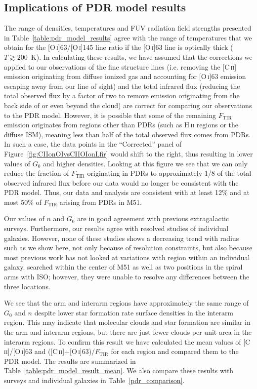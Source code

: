 \documentclass[preprint2]{aastex}
\begin{document}
\subsection{Implications of PDR model results}
The range of densities, temperatures and FUV radiation field strengths presented in Table~\ref{table:pdr_model_results} agree with the range of temperatures that we obtain for the [O\,\textsc{i}]63/[O\,\textsc{i}]145 line ratio if the [O\,\textsc{i}]63 line is optically thick ($T \gtrsim 200$~K).  In calculating these results, we have assumed that the corrections we applied to our observations of the fine structure lines (i.e. removing the [C\,\textsc{ii}] emission originating from diffuse ionized gas and accounting for [O\,\textsc{i}]63 emission escaping away from our line of sight) and the total infrared flux (reducing the total observed flux by a factor of two to remove emission originating from the back side of or even beyond the cloud) are correct for comparing our observations to the PDR model.  However, it is possible that some of the remaining $F_{\mathrm{TIR}}$ emission originates from regions other than PDRs (such as H\,\textsc{ii} regions or the diffuse ISM), meaning less than half of the total observed flux comes from PDRs.  In such a case, the data points in the ``Corrected'' panel of Figure~\ref{fig:CIIonOIvsCIIOIonLfir} would shift to the right, thus resulting in lower values of $G_{0}$ and higher densities.  Looking at this figure we see that we can only reduce the fraction of $F_{\mathrm{TIR}}$ originating in PDRs to approximately 1/8 of the total observed infrared flux before our data would no longer be consistent with the PDR model.  Thus, our data and analysis are consistent with at least 12\% and at most 50\% of $F_{\mathrm{TIR}}$ arising from PDRs in M51.

Our values of $n$ and $G_{0}$ are in good agreement with previous extragalactic surveys. Furthermore, our results agree with resolved studies of individual galaxies.  However, none of these studies shows a decreasing trend with radius such as we show here, not only because of resolution constraints, but also because most previous work has not looked at variations with region within an individual galaxy.  \citet{2005A&A...441..961K} searched within the center of M51 as well as two positions in the spiral arms with ISO; however, they were unable to resolve any differences between the three locations.

We see that the arm and interarm regions have approximately the same range of $G_{0}$ and $n$ despite lower star formation rate surface densities in the interarm region.  This may indicate that molecular clouds and star formation are similar in the arm and interarm regions, but there are just fewer clouds per unit area in the interarm regions.  To confirm this result we have calculated the mean values of [C\,\textsc{ii}]/[O\,\textsc{i}]63 and ([C\,\textsc{ii}]+[O\,\textsc{i}]63)/$F_{\mathrm{TIR}}$ for each region and compared them to the PDR model.  The results are summarized in Table~\ref{table:pdr_model_result_mean}.  We also compare these results with surveys and individual galaxies in Table~\ref{pdr_comparison}.
\end{document}

